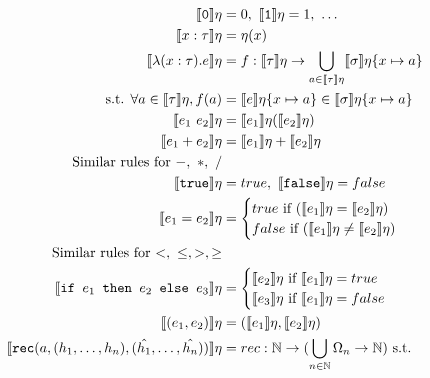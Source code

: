  \begin{figure}
 \begin{align*}
 \llbracket \texttt{0} \rrbracket\eta &= 0, \  \llbracket \texttt{1} \rrbracket\eta = 1, \ \ldots \\
  \llbracket x : \tau \rrbracket\eta &= \eta(x) \\
  \llbracket \lambda (x : \tau) . e \rrbracket\eta &= f : \llbracket \tau \rrbracket\eta 
  \rightarrow \bigcup_{a \in \llbracket \tau \rrbracket\eta} \llbracket \sigma \rrbracket\eta\{x\mapsto a\} \\
\text{ s.t. } \forall a \in \llbracket \tau \rrbracket\eta, f(a) &= \llbracket e \rrbracket\eta\{ x \mapsto a \} 
  \in \llbracket \sigma \rrbracket\eta\{x\mapsto a\}\\
 \llbracket e_1 \ e_2 \rrbracket \eta &= \llbracket e_1 \rrbracket\eta ( \llbracket e_2 \rrbracket\eta ) \\
 \llbracket e_1 + e_2 \rrbracket\eta &= \llbracket e_1 \rrbracket\eta + \llbracket e_2 \rrbracket\eta \\
\text{Similar rules for $-, \ *, \ /$} \\
  \llbracket \texttt{true} \rrbracket\eta &= true, \ \llbracket \texttt{false} \rrbracket\eta = false \\
 \llbracket e_1 = e_2 \rrbracket\eta &= 
 \begin{cases} 
      true \text{ if } (\llbracket e_1 \rrbracket\eta = \llbracket e_2 \rrbracket\eta) \\
      false \text{  if } (\llbracket e_1 \rrbracket\eta \neq \llbracket e_2\rrbracket\eta)\\
   \end{cases} \\
\text{Similar rules for $<, \ \leq, >, \geq$} \\
  \llbracket \ifelse{e_1}{e_2}{e_3} \rrbracket \eta &= 
 \begin{cases} 
      \llbracket e_2 \rrbracket\eta \text{ if } \llbracket e_1 \rrbracket\eta = true \\
      \llbracket e_3 \rrbracket\eta \text{ if } \llbracket e_1 \rrbracket\eta = false \\ 
   \end{cases}
  \\
  \llbracket (e_1,e_2) \rrbracket\eta &= (\llbracket e_1 \rrbracket\eta, \llbracket e_2 \rrbracket\eta) \\
    \llbracket  \texttt{rec} (a,(h_1,\ldots,h_n),(\hat{h_1},\ldots,\hat{h_n})) \rrbracket\eta &= rec: \N \rightarrow 
    (\bigcup_{n\in \N} \Omega_n \rightarrow \N)   \text{ s.t. }  \\

\end{align*}
\end{figure}

